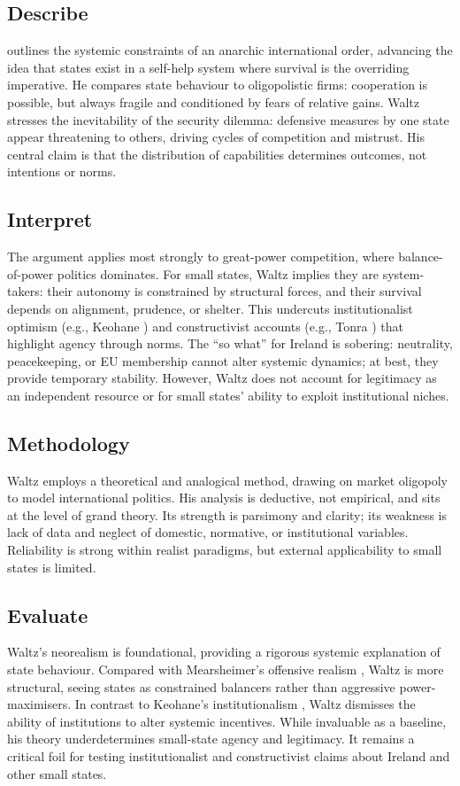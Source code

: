 \subsection*{Describe}
\textcite{WALTZ_1969} outlines the systemic constraints of an anarchic international order, advancing the idea that states exist in a self-help system where survival is the overriding imperative. He compares state behaviour to oligopolistic firms: cooperation is possible, but always fragile and conditioned by fears of relative gains. Waltz stresses the inevitability of the security dilemma: defensive measures by one state appear threatening to others, driving cycles of competition and mistrust. His central claim is that the distribution of capabilities determines outcomes, not intentions or norms.

\subsection*{Interpret}
The argument applies most strongly to great-power competition, where balance-of-power politics dominates. For small states, Waltz implies they are system-takers: their autonomy is constrained by structural forces, and their survival depends on alignment, prudence, or shelter. This undercuts institutionalist optimism (e.g., Keohane \parencite{KEOHANE_1969}) and constructivist accounts (e.g., Tonra \parencite{TONRA_1999}) that highlight agency through norms. The “so what” for Ireland is sobering: neutrality, peacekeeping, or EU membership cannot alter systemic dynamics; at best, they provide temporary stability. However, Waltz does not account for legitimacy as an independent resource or for small states’ ability to exploit institutional niches.

\subsection*{Methodology}
Waltz employs a theoretical and analogical method, drawing on market oligopoly to model international politics. His analysis is deductive, not empirical, and sits at the level of grand theory. Its strength is parsimony and clarity; its weakness is lack of data and neglect of domestic, normative, or institutional variables. Reliability is strong within realist paradigms, but external applicability to small states is limited.

\subsection*{Evaluate}
Waltz’s neorealism is foundational, providing a rigorous systemic explanation of state behaviour. Compared with Mearsheimer’s offensive realism \parencite{MEARSHEIMER_1994}, Waltz is more structural, seeing states as constrained balancers rather than aggressive power-maximisers. In contrast to Keohane’s institutionalism \parencite{KEOHANE_1988}, Waltz dismisses the ability of institutions to alter systemic incentives. While invaluable as a baseline, his theory underdetermines small-state agency and legitimacy. It remains a critical foil for testing institutionalist and constructivist claims about Ireland and other small states.

